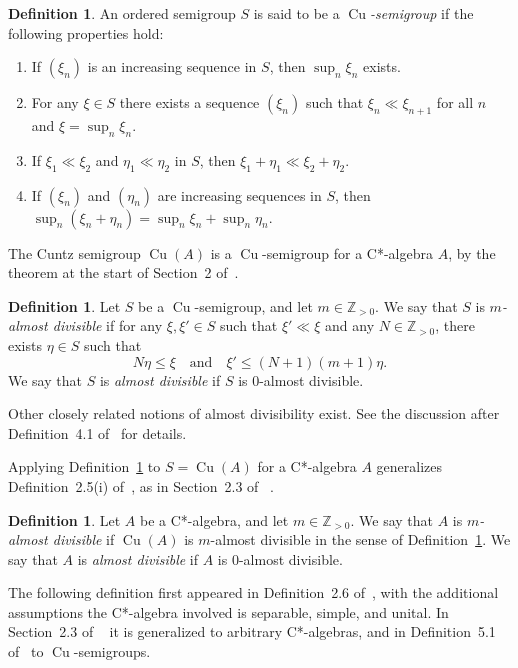 \documentclass[10pt]{amsart}
\numberwithin{equation}{section}
\theoremstyle{definition}
\newtheorem{dfn}[thm]{Definition}
\newcommand{\N}{{\mathbb{Z}}_{> 0}}
\newcommand{\Cu}{{\operatorname{Cu}}}
\begin{document}
\begin{dfn}\label{D_Cu_Semigp}
An ordered semigroup $S$ is said to be a \emph{$\Cu$-semigroup}
if the following properties hold:
%
\begin{enumerate}
%
\item
If $(\xi_n)$ is an increasing sequence in $S$,
then $\sup_n \xi_n$ exists.
%
\item
For any $\xi \in S$ there exists a sequence $(\xi_n)$
such that $\xi_n \ll \xi_{n+1}$ for all $n$ and
$\xi = \sup_n \xi_n$.
%
\item
If $\xi_1 \ll \xi_2$ and $\eta_1 \ll \eta_2$ in $S$,
then $\xi_1 + \eta_1 \ll \xi_2 + \eta_2$.
%
\item
If $(\xi_n)$ and $(\eta_n)$ are increasing sequences
in $S$, then $\sup_n (\xi_n + \eta_n) = \sup_n \xi_n + \sup_n \eta_n$.
%
\end{enumerate}
%
\end{dfn}

The Cuntz semigroup $\Cu (A)$ is a $\Cu$-semigroup
for a C*-algebra $A$, by the theorem at the start of Section~2
of~\cite{CoElIv2008}.

\begin{dfn}\label{def_almost_divisibility}
Let $S$ be a $\Cu$-semigroup, and let $m \in \N$.
We say that $S$ is \emph{$m$-almost divisible} if
for any $\xi, \xi' \in S$ such that $\xi' \ll \xi$
and any $N \in \N$, there exists $\eta \in S$ such that
%
\[
N \eta \leq \xi \quad{\mbox{and}}\quad \xi' \leq
(N + 1) (m + 1) \eta.
\]
%
We say that $S$ is \emph{almost divisible} if $S$ is
$0$-almost divisible.
\end{dfn}

Other closely related notions of almost divisibility exist.
See the discussion after Definition~4.1 of~\cite{AnPrTlVt}
for details.

Applying Definition~\ref{def_almost_divisibility}
to $S = \Cu (A)$ for a C*-algebra $A$ generalizes
Definition~2.5(i) of~\cite{Wint2012}, as in Section~2.3 of ~\cite{RbTk}.

\begin{dfn}\label{D_AlmostDiv_Alg}
Let $A$ be a C*-algebra, and let $m \in \N$.
We say that
$A$ is \emph{$m$-almost divisible} if $\Cu(A)$ is $m$-almost
divisible in the sense of
Definition~\ref{def_almost_divisibility}.
We say that $A$ is
\emph{almost divisible} if $A$ is 0-almost divisible.
\end{dfn}

The following definition first appeared in
Definition~2.6 of~\cite{Wint2012}, with the additional
assumptions the C*-algebra involved is separable, simple, and
unital.
In Section~2.3 of ~\cite{RbTk} it is generalized to
arbitrary C*-algebras, and in
Definition~5.1 of~\cite{AnPrTlVt} to $\Cu$-semigroups.
\end{document}
